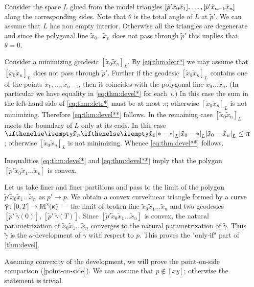 {\sloppy

Consider the space $L$ glued from the model triangles $\trig{\tilde p'}{\tilde x_{0}}{\tilde x_1},\z\dots,\trig{\tilde p'}{\tilde x_{n-1}}{\tilde x_n}$ along the corresponding sides.
Note that $\theta$ is the total angle of $L$ at $\tilde p'$.
We can assume that $L$ has non empty interior.
Otherwise all the triangles are degenerate and
since the polygonal line $\tilde x_0\dots\tilde x_n$ does not pass through $\tilde p'$ this implies that $\theta=0$.

}

Consider a minimizing geodesic $[\tilde x_0\tilde x_n]_L$.
By \ref{eq:thm:detr*} we may assume that $[\tilde x_0\tilde x_n]_L$ does not pass through $\tilde p'$.
Further if the geodesic $[\tilde x_0\tilde x_n]_L$ contains one of the points
$\tilde x_1,\dots,\tilde x_{n-1}$, then it coincides with the polygonal line $\tilde x_0\dots\tilde x_n$.
(In particular we have equality in \ref{eq:thm:devel*} for each~$i$.)
In this case the sum in the left-hand side of \ref{eq:thm:detr*} must be at most $\pi$; otherwise $[\tilde x_0\tilde x_n]_L$ is not minimizing.
Therefore \ref{eq:thm:devel**} follows.
In the remaining case $[\tilde x_0\tilde x_n]_L$ meets the boundary of $L$ only at its ends.
In this case $\dist{\tilde x_0}{\tilde x_n}{L}\le \pi$; otherwise $[\tilde x_0\tilde x_n]_L$ is not minimizing.
Whence \ref{eq:thm:devel**} follows.

Inequalities \ref{eq:thm:devel*} and \ref{eq:thm:devel**} imply that the polygon $[\tilde p'\tilde x_0\tilde x_1\dots \tilde x_n]$ is convex.

Let us take finer and finer partitions and pass to the limit of the polygon $\tilde p'\tilde x_0\tilde x_1\dots \tilde x_n$ as $p'\to p$.
We obtain a convex curvelinear triangle formed by a curve $\tilde \gamma\:[0,T]\to\Lob2{\kappa}$ --- the limit of broken line $\tilde x_0\tilde x_1\dots \tilde x_n$ 
and two geodesics $[\tilde p'\,\tilde \gamma(0)]$,
$[\tilde p'\,\tilde \gamma(T)]$.
Since $[\tilde p'\tilde x_0\tilde x_1\dots \tilde x_n]$ is convex,
 the natural parametrization of $\tilde x_0\tilde x_1\dots \tilde x_n$ 
converges to the natural parametrization of $\tilde \gamma$. %
Thus $\tilde \gamma$ is the $\kappa$-development of $\gamma$ with respect to $p$. This proves the "only-if" part of \eqref{thm:devel}.

Assuming convexity of the development, we will prove the point-on-side comparison (\ref{point-on-side}). 
We can assume that $p\notin [x y]$; otherwise the statement is trivial.

